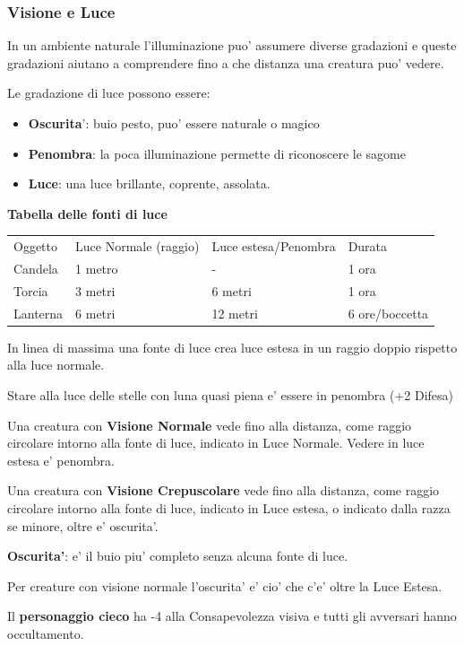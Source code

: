 \documentclass[a4paper,11pt,twoside,openany]{dndbook}
\begin{document}
{\subsubsection{Visione e Luce}

\label{visione-e-luce}

In un ambiente naturale l'illuminazione puo' assumere diverse gradazioni e queste gradazioni aiutano a comprendere fino a che distanza una creatura puo' vedere.

Le gradazione di luce possono essere:
\begin{itemize}
\item 
\textbf{Oscurita}': buio pesto, puo' essere naturale o magico 
\item 
\textbf{Penombra}: la poca illuminazione permette di riconoscere le
sagome 
\item 
\textbf{Luce}: una luce brillante, coprente, assolata. 
\end{itemize}
\textbf{Tabella delle fonti di luce}
\begin{tabular}[c]{@{}llll@{}}
\toprule 
Oggetto & Luce Normale (raggio) & Luce estesa/Penombra & Durata\tabularnewline
Candela & 1 metro & - & 1 ora\tabularnewline
Torcia & 3 metri & 6 metri & 1 ora\tabularnewline
Lanterna & 6 metri & 12 metri & 6 ore/boccetta\tabularnewline
\bottomrule
\end{tabular}

\bigskip

In linea di massima una fonte di luce crea luce estesa in un raggio doppio rispetto alla luce normale.

Stare alla luce delle stelle con luna quasi piena e' essere in penombra (+2 Difesa)

Una creatura con \textbf{Visione Normale} vede fino alla distanza, come raggio circolare intorno alla fonte di luce, indicato in Luce Normale. Vedere in luce estesa e' penombra.

Una creatura con \textbf{Visione Crepuscolare} vede fino alla distanza, come raggio circolare intorno alla fonte di luce, indicato in Luce estesa, o indicato dalla razza se minore, oltre e' oscurita'.

\textbf{Oscurita'}: e' il buio piu' completo senza alcuna fonte di luce.

Per creature con visione normale l'oscurita' e' cio' che c'e' oltre la Luce Estesa.

Il \textbf{personaggio cieco} ha -4 alla Consapevolezza visiva e tutti gli avversari hanno occultamento.

}
\end{document}
